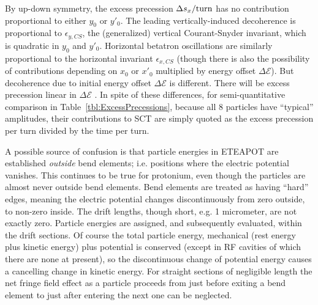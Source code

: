 \documentclass[]{article}
\begin{document}
By up-down symmetry, the excess precession $\Delta s_x/{\rm turn}$ has
no contribution proportional to either $y_0$ or $y'_0$. The leading 
vertically-induced decoherence
is proportional to $\epsilon_{y,CS}$, the (generalized) vertical Courant-Snyder
invariant, which is quadratic in $y_0$ and $y'_0$. Horizontal betatron
oscillations are similarly proportional to the horizontal invariant 
$\epsilon_{x,CS}$ (though there is also the possibility of contributions
depending on $x_0$ or $x'_0$ multiplied by energy offset
$\Delta\mathcal{E}$). But decoherence due to initial energy offset 
$\Delta\mathcal{E}$ is different. There will
be excess precession linear in $\Delta\mathcal{E}$ . In spite
of these differences, for semi-quantitative comparison 
in Table~\ref{tbl:ExcessPrecessions}, because all
8 particles have ``typical'' amplitudes, their contributions to SCT are
simply quoted as the excess precession per turn divided by the
time per turn.  

A possible source of confusion is that particle energies in
ETEAPOT are established \emph{outside} bend elements; i.e. positions
where the electric potential vanishes. This continues
to be true for protonium, even though the particles are almost
never outside bend elements. Bend elements are treated as having
``hard'' edges, meaning the electric potential changes discontinuously 
from zero outside, to non-zero inside. The drift lengths, though short, 
e.g. 1 micrometer, are not exactly zero. Particle energies are
assigned, and subsequently evaluated, within the drift sections.
Of course the total particle energy, mechanical (rest energy plus
kinetic energy) plus potential is conserved (except in RF cavities
of which there are none at present), so the discontinuous 
change of potential energy causes a cancelling change in kinetic 
energy. For straight sections of negligible length
the net fringe field effect as a particle proceeds from just 
before exiting a bend element to just after entering the next one
can be neglected.
\end{document}
